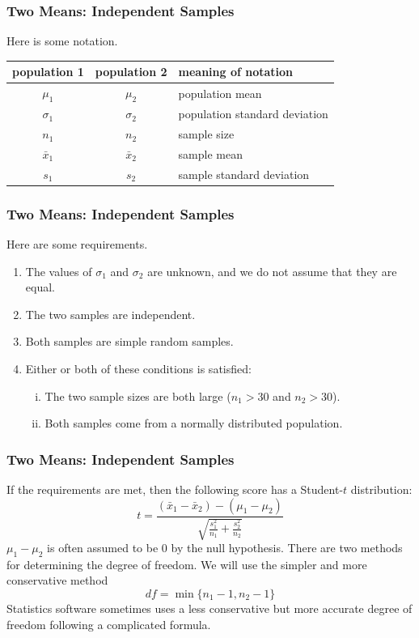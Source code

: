 \documentclass[xcolor=dvipsnames]{beamer}
\begin{document}
\begin{frame}
  \frametitle{Two Means: Independent Samples}
  Here is some notation.

\bigskip

  \begin{tabular}{|c|c|l|}\hline
    \textbf{population 1} & \textbf{population 2} & \textbf{meaning of notation} \\ \hline
    $\mu_{1}$ & $\mu_{2}$ & population mean \\ \hline
    $\sigma_{1}$ & $\sigma_{2}$ & population standard deviation \\ \hline
    $n_{1}$ & $n_{2}$ & sample size \\ \hline
    $\bar{x}_{1}$ & $\bar{x}_{2}$ & sample mean \\ \hline
    $s_{1}$ & $s_{2}$ & sample standard deviation \\ \hline
  \end{tabular}
\end{frame}

\begin{frame}
  \frametitle{Two Means: Independent Samples}
  Here are some requirements.

\bigskip

\begin{enumerate}
\item The values of $\sigma_{1}$ and $\sigma_{2}$ are unknown, and we do not assume that they are equal.
\item The two samples are independent.
\item Both samples are simple random samples.
\item Either or both of these conditions is satisfied:
  \begin{enumerate}[(i)]
  \item The two sample sizes are both large ($n_{1}>30$ and
    $n_{2}>30$).
  \item Both samples come from a normally distributed population.
  \end{enumerate}
\end{enumerate}
\end{frame}

\begin{frame}
  \frametitle{Two Means: Independent Samples}
  If the requirements are met, then the following score has a
  Student-$t$ distribution:
  \begin{equation}
    \label{eq:ooxaifei}
    t=\frac{(\bar{x}_{1}-\bar{x}_{2})-(\mu_{1}-\mu_{2})}{\sqrt{\frac{s_{1}^{2}}{n_{1}}+\frac{s_{2}^{2}}{n_{2}}}}
  \end{equation}
$\mu_{1}-\mu_{2}$ is often assumed to be $0$ by the null
hypothesis. There are two methods for determining the degree of
freedom. We will use the simpler and more conservative method
\begin{equation}
  \label{eq:rohvaete}
  df=\min\{n_{1}-1,n_{2}-1\}
\end{equation}
Statistics software sometimes uses a less conservative but more
accurate degree of freedom following a complicated formula.
\end{frame}
\end{document}
